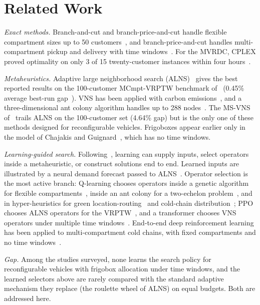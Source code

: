 \documentclass[conference]{IEEEtran}
\begin{document}
\section{Related Work}
\textit{Exact methods.} Branch-and-cut and branch-price-and-cut handle flexible compartment sizes up to 50 customers~\cite{hessler2021}, and branch-price-and-cut handles multi-compartment pickup and delivery with time windows~\cite{aerts2024}. For the MVRDC, CPLEX proved optimality on only 3 of 15 twenty-customer instances within four hours~\cite{masmoudi2026}.

\textit{Metaheuristics.} Adaptive large neighborhood search (ALNS)~\cite{ropke2006} gives the best reported results on the 100-customer MCmpt-VRPTW benchmark of~\cite{chenshi2019} (0.45\% average best-run gap~\cite{eshtehadi2020}). VNS has been applied with carbon emissions~\cite{chen2020vns}, and a three-dimensional ant colony algorithm handles up to 288 nodes~\cite{guo2022}. The MS-VNS of~\cite{masmoudi2026} trails ALNS on the 100-customer set (4.64\% gap) but is the only one of these methods designed for reconfigurable vehicles. Frigoboxes appear earlier only in the model of Chajakis and Guignard~\cite{chajakis2003}, which has no time windows.

\textit{Learning-guided search.} Following~\cite{karimi2022}, learning can supply inputs, select operators inside a metaheuristic, or construct solutions end to end. Learned inputs are illustrated by a neural demand forecast passed to ALNS~\cite{chamurally2024}. Operator selection is the most active branch: Q-learning chooses operators inside a genetic algorithm for flexible compartments~\cite{huang2026}, inside an ant colony for a two-echelon problem~\cite{xiang2026}, and in hyper-heuristics for green location-routing~\cite{shang2023} and cold-chain distribution~\cite{wu2027}; PPO chooses ALNS operators for the VRPTW~\cite{wang2025}, and a transformer chooses VNS operators under multiple time windows~\cite{xu2026}. End-to-end deep reinforcement learning has been applied to multi-compartment cold chains, with fixed compartments and no time windows~\cite{hu2025}.

\textit{Gap.} Among the studies surveyed, none learns the search policy for reconfigurable vehicles with frigobox allocation under time windows, and the learned selectors above are rarely compared with the standard adaptive mechanism they replace (the roulette wheel of ALNS) on equal budgets. Both are addressed here.
\end{document}
